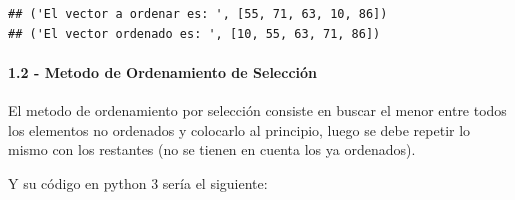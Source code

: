 \documentclass[
]{article}
\begin{document}
\begin{verbatim}
## ('El vector a ordenar es: ', [55, 71, 63, 10, 86])
## ('El vector ordenado es: ', [10, 55, 63, 71, 86])
\end{verbatim}

\hypertarget{metodo-de-ordenamiento-de-selecciuxf3n}{%
\paragraph{1.2 - Metodo de Ordenamiento de
Selección}\label{metodo-de-ordenamiento-de-selecciuxf3n}}

El metodo de ordenamiento por selección consiste en buscar el menor
entre todos los elementos no ordenados y colocarlo al principio, luego
se debe repetir lo mismo con los restantes (no se tienen en cuenta los
ya ordenados).

Y su código en python 3 sería el siguiente:
\end{document}
